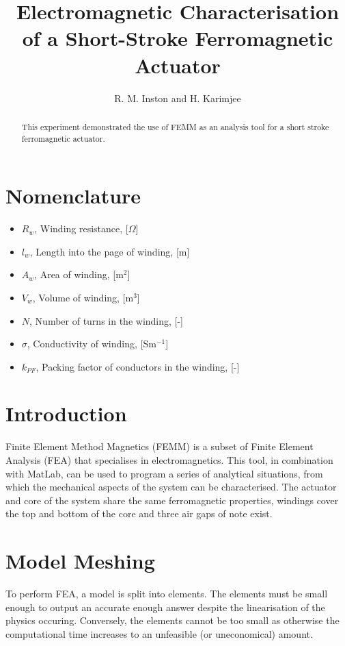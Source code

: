 \documentclass[a4paper]{IEEEtran}
\begin{document}
\title{Electromagnetic Characterisation of a Short-Stroke Ferromagnetic Actuator}
\author{R. M. Inston and H. Karimjee}

\maketitle
\begin{abstract}
This experiment demonstrated the use of FEMM as an analysis tool for a short stroke ferromagnetic actuator. 
\end{abstract}

\section{Nomenclature}
\begin{itemize}
\item[]{$R_{w}$, Winding resistance, [$\Omega$]}
\item[]{$l_{w}$, Length into the page of winding, [m]}
\item[]{$A_{w}$, Area of winding, [m$^{2}$]}
\item[]{$V_{w}$, Volume of winding, [m$^{3}$]}
\item[]{$N$, Number of turns in the winding, [-]}
\item[]{$\sigma$, Conductivity of winding, [Sm$^{-1}$]}
\item[]{$k_{PF}$, Packing factor of conductors in the winding, [-]}
\end{itemize}

\section{Introduction}
Finite Element Method Magnetics (FEMM) is a subset of Finite Element Analysis (FEA) that specialises in electromagnetics. This tool, in combination with MatLab, can be used to program a series of analytical situations, from which the mechanical aspects of the system can be characterised. The actuator and core of the system share the same ferromagnetic properties, windings cover the top and bottom of the core and three air gaps of note exist.

\section{Model Meshing}
To perform FEA, a model is split into elements. The elements must be small enough to output an accurate enough answer despite the linearisation of the physics occuring. Conversely, the elements cannot be too small as otherwise the computational time increases to an unfeasible (or uneconomical) amount.
\end{document}
